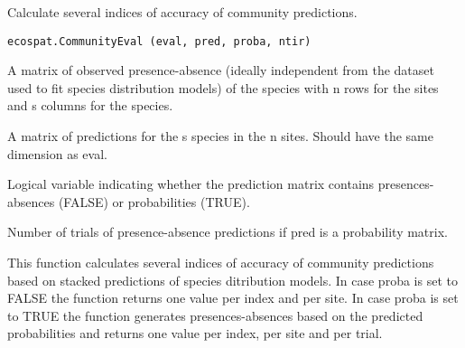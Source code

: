 \documentclass[a4paper]{book}
\begin{document}
%
\begin{Description}\relax
Calculate several indices of accuracy of community predictions.
\end{Description}
%
\begin{Usage}
\begin{verbatim}
ecospat.CommunityEval (eval, pred, proba, ntir)
\end{verbatim}
\end{Usage}
%
\begin{Arguments}
\begin{ldescription}
\item[\code{eval}] A matrix of observed presence-absence (ideally independent from the dataset used to fit species distribution models) of the species with n rows for the sites and s columns for the species.
\item[\code{pred}] A matrix of predictions for the s species in the n sites. Should have the same dimension as eval.
\item[\code{proba}] Logical variable indicating whether the prediction matrix contains presences-absences (FALSE) or probabilities (TRUE).
\item[\code{ntir}] Number of trials of presence-absence predictions if pred is a probability matrix.
\end{ldescription}
\end{Arguments}
%
\begin{Details}\relax
This function calculates several indices of accuracy of community predictions based on stacked predictions of species ditribution models. In case proba is set to FALSE the function returns one value per index and per site. In case proba is set to TRUE the function generates presences-absences based on the predicted probabilities and returns one value per index, per site and per trial.
\end{Details}
%
\end{document}
